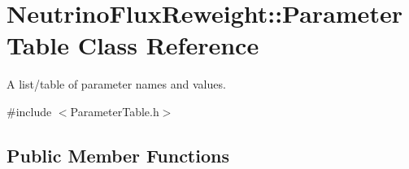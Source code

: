 \hypertarget{class_neutrino_flux_reweight_1_1_parameter_table}{\section{Neutrino\-Flux\-Reweight\-:\-:Parameter\-Table Class Reference}
\label{class_neutrino_flux_reweight_1_1_parameter_table}
}


A list/table of parameter names and values.  




{\ttfamily \#include $<$Parameter\-Table.\-h$>$}

\subsection*{Public Member Functions}
